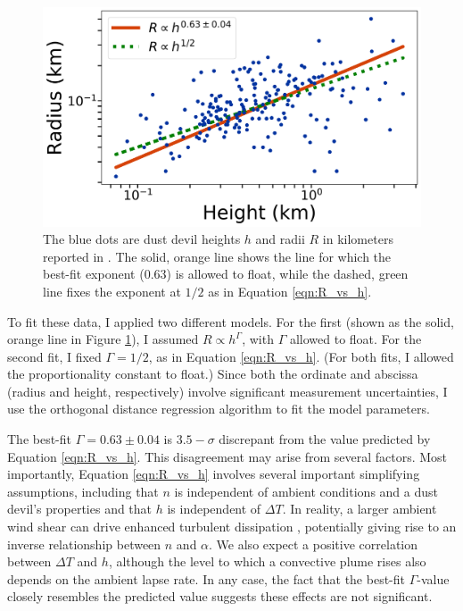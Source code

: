 \documentclass{aastex63}
\begin{document}
\begin{figure}
    \centering
    \includegraphics[width=\textwidth]{Fit_to_Stanzel_data.png}
    \caption{The blue dots are dust devil heights $h$ and radii $R$ in kilometers reported in \citet{2008Icar..197...39S}. The solid, orange line shows the line for which the best-fit exponent (0.63) is allowed to float, while the dashed, green line fixes the exponent at $1/2$ as in Equation \ref{eqn:R_vs_h}.}
    \label{fig:Fit_to_Stanzel_data}
\end{figure}

To fit these data, I applied two different models. For the first (shown as the solid, orange line in Figure \ref{fig:Fit_to_Stanzel_data}), I assumed $R \propto h^\Gamma$, with $\Gamma$ allowed to float. For the second fit, I fixed $\Gamma = 1/2$, as in Equation \ref{eqn:R_vs_h}. (For both fits, I allowed the proportionality constant to float.) Since both the ordinate and abscissa (radius and height, respectively) involve significant measurement uncertainties, I use the orthogonal distance regression algorithm \citep{odrref, scipy} to fit the model parameters.

The best-fit $\Gamma = 0.63 \pm 0.04$ is $3.5-\sigma$ discrepant from the value predicted by Equation \ref{eqn:R_vs_h}. This disagreement may arise from several factors. Most importantly, Equation \ref{eqn:R_vs_h} involves several important simplifying assumptions, including that $n$ is independent of ambient conditions and a dust devil's properties and that $h$ is independent of $\Delta T$. In reality, a larger ambient wind shear can drive enhanced turbulent dissipation \citep{arya1988}, potentially giving rise to an inverse relationship between $n$ and $\alpha$. We also expect a positive correlation between $\Delta T$ and $h$, although the level to which a convective plume rises also depends on the ambient lapse rate. In any case, the fact that the best-fit $\Gamma$-value closely resembles the predicted value suggests these effects are not significant.
\end{document}
